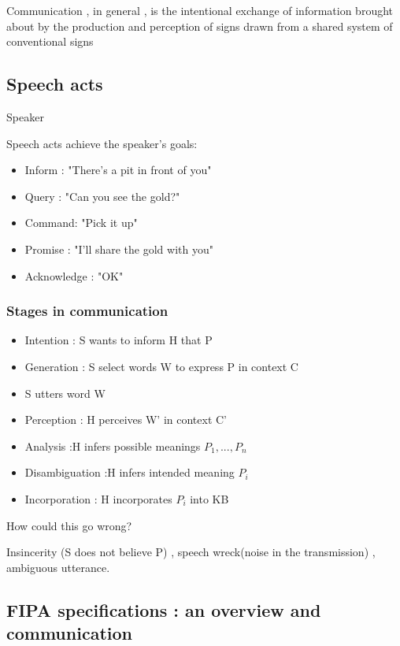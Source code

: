 \documentclass{article}
\begin{document}
Communication , in general , is the intentional exchange of information brought about by the production and perception of signs drawn from a shared system of conventional signs

\subsection{Speech acts}

Speaker 

Speech acts achieve the speaker's goals: 

\begin{itemize}
    \item Inform : "There's a pit in front of you"
    \item Query : "Can you see the gold?"
    \item Command: "Pick it up"
    \item Promise : "I'll share the gold with you"
    \item Acknowledge : "OK"
\end{itemize}

\subsubsection{Stages in communication}

\begin{itemize}
    \item Intention : S wants to inform H that P
    \item Generation : S select words W to express P in context C
    \item S utters word W
    \item Perception : H perceives W' in context C'
    \item Analysis :H infers possible meanings $P_1,...,P_n$
    \item Disambiguation :H infers intended meaning $P_i$
    \item Incorporation : H incorporates $P_i$ into KB
\end{itemize}

How could this go wrong? 

Insincerity (S does not believe P) , speech wreck(noise in the transmission) , ambiguous utterance.

\subsection{FIPA specifications : an overview and communication}
\end{document}
